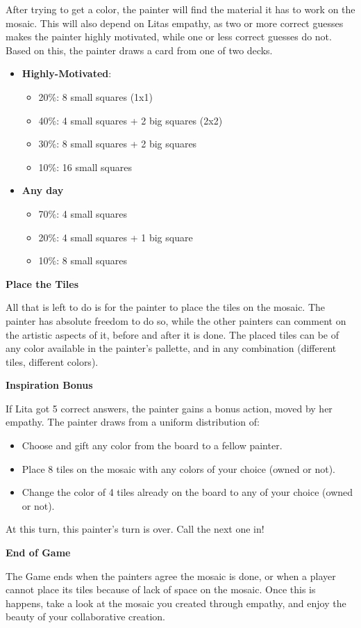 \documentclass[twocolumn]{article}
\newcommand{\lvl}[1]{\vspace{0.5cm}\Large{\textbf{#1}}\vspace{0.2cm}}
\begin{document}
After trying to get a color, the painter will find the material it has to work on the mosaic. This will also depend on Litas empathy, as two or more correct guesses makes the painter highly motivated, while one or less correct guesses do not. Based on this, the painter draws a card from one of two decks. 
\begin{itemize}
    \item \textbf{Highly-Motivated}:
    \begin{itemize}
        \item 20\%: 8 small squares (1x1)
        \item 40\%: 4 small squares + 2 big squares (2x2)
        \item 30\%: 8 small squares + 2 big squares 
        \item 10\%: 16 small squares
    \end{itemize}
    \item \textbf{Any day}
    \begin{itemize}
        \item 70\%: 4 small squares
        \item 20\%: 4 small squares + 1 big square 
        \item 10\%: 8 small squares
    \end{itemize}
\end{itemize}


\lvl{Place the Tiles}

All that is left to do is for the painter to place the tiles on the mosaic. The painter has absolute freedom to do so, while the other painters can comment on the artistic aspects of it, before and after it is done. The placed tiles can be of any color available in the painter's pallette, and in any combination (different tiles, different colors).

\lvl{Inspiration Bonus}

If Lita got 5 correct answers, the painter gains a bonus action, moved by her empathy. The painter draws from a uniform distribution of:
\begin{itemize}
    \item Choose and gift any color from the board to a fellow painter. 
    \item Place 8 tiles on the mosaic with any colors of your choice (owned or not).
    \item Change the color of 4 tiles already on the board to any of your choice (owned or not).
\end{itemize}


At this turn, this painter's turn is over. Call the next one in!

\lvl{End of Game}

The Game ends when the painters agree the mosaic is done, or when a player cannot place its tiles because of lack of space on the mosaic. Once this is happens, take a look at the mosaic you created through empathy, and enjoy the beauty of your collaborative creation.

% 
% 
\end{document}
